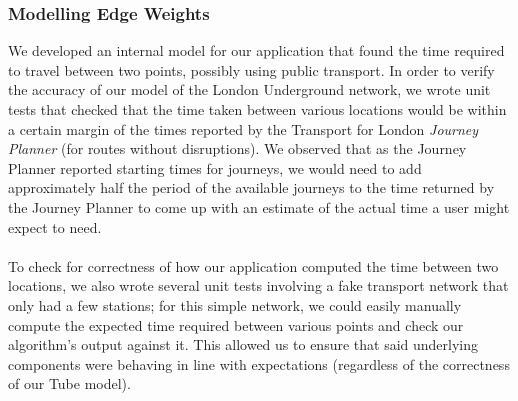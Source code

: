 \documentclass[a4paper, 10pt]{report}
\begin{document}
\subsubsection{Modelling Edge Weights}
We developed an internal model for our application that found the time required to travel between two points, possibly using public transport. In order to verify the accuracy of our model of the London Underground network, we wrote unit tests that checked that the time taken between various locations would be within a certain margin of the times reported by the Transport for London \textit{Journey Planner} \cite{tfl-journey-planner} (for routes without disruptions). We observed that as the Journey Planner reported starting times for journeys, we would need to add approximately half the period of the available journeys to the time returned by the Journey Planner to come up with an estimate of the actual time a user might expect to need. \\\\
To check for correctness of how our application computed the time between two locations, we also wrote several unit tests involving a fake transport network that only had a few stations; for this simple network, we could easily manually compute the expected time required between various points and check our algorithm's output against it. This allowed us to ensure that said underlying components were behaving in line with expectations (regardless of the correctness of our Tube model).
\end{document}

